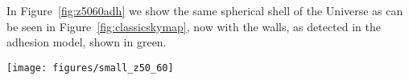In Figure~\ref{fig:z5060adh} we show the same spherical shell of the Universe as can be seen in Figure~\ref{fig:classicskymap}, now with the walls, as detected in the adhesion model, shown in green.

\begin{sidewaysfigure}
    \texttt{[image: figures/small\_z50\_60]}
    \caption{Structures between $50 - 60 \Mpc$. Red diamonds show the galaxies from the \ac{2MRS}. Adhesion walls are show in shades of green. }\label{fig:z5060adh}
\end{sidewaysfigure}

\begin{subappendices}


\end{subappendices}
